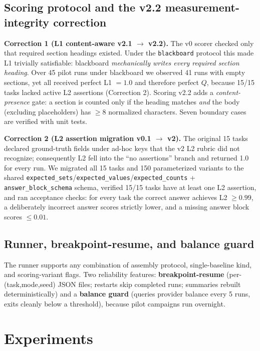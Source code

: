 \documentclass{article}
\newcommand{\code}[1]{\texttt{#1}}
\begin{document}
\subsection{Scoring protocol and the v2.2 measurement-integrity correction}
\label{sec:scoring}

\textbf{Correction 1 (L1 content-aware v2.1 $\to$ v2.2).} The v0 scorer checked only that required section headings existed. Under the \code{blackboard} protocol this made L1 trivially satisfiable: blackboard \emph{mechanically writes every required section heading}. Over 45 pilot runs under blackboard we observed 41 runs with empty sections, yet all received perfect L1 $= 1.0$ and therefore perfect $Q$, because 15/15 tasks lacked active L2 assertions (Correction 2). Scoring v2.2 adds a \emph{content-presence} gate: a section is counted only if the heading matches \emph{and} the body (excluding placeholders) has $\ge$8 normalized characters. Seven boundary cases are verified with unit tests.

\textbf{Correction 2 (L2 assertion migration v0.1 $\to$ v2).} The original 15 tasks declared ground-truth fields under ad-hoc keys that the v2 L2 rubric did not recognize; consequently L2 fell into the ``no assertions'' branch and returned 1.0 for every run. We migrated all 15 tasks and 150 parameterized variants to the shared \code{expected\_sets}/\code{expected\_values}/\code{expected\_counts} + \code{answer\_block\_schema} schema, verified 15/15 tasks have at least one L2 assertion, and ran acceptance checks: for every task the correct answer achieves L2 $\ge 0.99$, a deliberately incorrect answer scores strictly lower, and a missing answer block scores $\le 0.01$.

\subsection{Runner, breakpoint-resume, and balance guard}
\label{sec:runner}

The runner supports any combination of assembly protocol, single-baseline kind, and scoring-variant flags. Two reliability features: \textbf{breakpoint-resume} (per-(task,mode,seed) JSON files; restarts skip completed runs; summaries rebuilt deterministically) and a \textbf{balance guard} (queries provider balance every 5 runs, exits cleanly below a threshold), because pilot campaigns run overnight.

\section{Experiments}
\label{sec:experiments}
\end{document}
